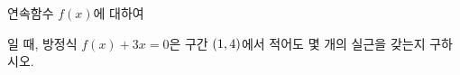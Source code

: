 연속함수 $f(x)$에 대하여 \par\smallskip{}\par\smallskip\noindent 일 때, 방정식 $f(x)+3x=0$은 구간 $(1{,}\mkern3mu\mathopen{}4)$에서 적어도 몇 개의 실근을 갖는지 구하시오.
